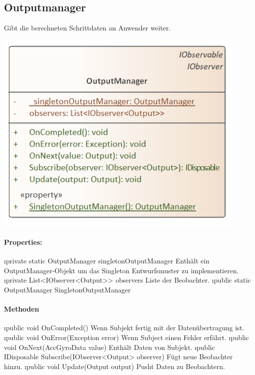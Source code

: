 \documentclass[../entwurf.tex]{subfiles}
\begin{document}
    \subsection{Outputmanager}
        Gibt die berechneten Schrittdaten an Anwender weiter.
        \begin{center}
            \includegraphics[page=1,width=350pt,keepaspectratio]{../uml_klassen/StepDetectionLib/OutputManager.png}
        \end{center}
        \paragraph{Properties:}
        \begin{itemize}
            \i{private static OutputManager singletonOutputManager} Enthält ein OutputManager-Objekt um das Singleton Entwurfsmuster zu implementieren.
            \i{private List<IObserver<Output>> observers} Liste der Beobachter.
            \i{public static OutputManager SingletonOutputManager} 
        \end{itemize}
        \paragraph{Methoden}
        \begin{itemize}
            \i{public void OnCompleted()} Wenn Subjekt fertig mit der Datenübertragung ist.
            \i{public void OnError(Exception error)} Wenn Subject einen Fehler erfährt.
            \i{public void OnNext(AccGyroData value)} Enthält Daten von Subjekt.
            \i{public IDisposable Subscribe(IObserver<Output> observer)} Fügt neue Beobachter hinzu.
            \i{public void Update(Output output)} Pusht Daten zu Beobachtern.
        \end{itemize}
    
\end{document}
